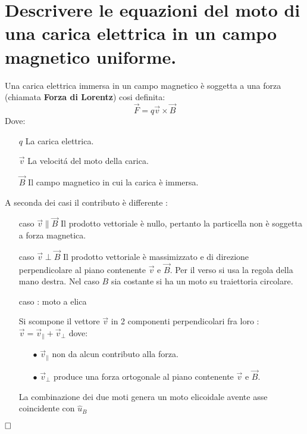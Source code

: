 \section{Descrivere le equazioni del moto di una carica elettrica
	in un campo magnetico uniforme.}
Una carica elettrica immersa in un campo magnetico \`e soggetta a una forza (chiamata \textbf{Forza di Lorentz}) cosi definita:
$$
    \vec{F} =  q\vec{v} \times \vec{B}
$$
Dove:
\begin{itemize}
	\item [$q$] { La carica elettrica. }
	\item [$\vec{v}$] { La velocit\'a del moto della carica. }
	\item [$\vec{B}$] { Il campo magnetico in cui la carica \`e immersa. }
\end{itemize}
A seconda dei casi il contributo \`e differente :
\begin{itemize}
	\item [caso $\vec{v} \parallel \vec{B}$] { Il prodotto vettoriale \`e nullo, pertanto la particella non \`e soggetta a forza magnetica. }
	\item [caso $\vec{v} \perp \vec{B}$] { Il prodotto vettoriale \`e massimizzato e di direzione perpendicolare al piano contenente $\vec{v}$ e $\vec{B}$. Per il verso si usa la regola della mano destra.
		Nel caso $B$ sia costante si ha un moto su traiettoria circolare. }
	\item [caso : moto a elica] { 
		Si scompone il vettore $\vec{v}$ in 2 componenti perpendicolari fra loro : \\
		$\vec{v} = \vec{v}_{\parallel} + \vec{v}_{\perp}$ dove:
		\begin{itemize}
			\item [$\bullet$] { 
				$\vec{v}_{\parallel}$ non da alcun contributo alla forza.
			}
			\item [$\bullet$] { $\vec{v}_{\perp}$ produce una forza ortogonale al piano contenente $\vec{v}$ e $\vec{B}$. }
		\end{itemize}
		La combinazione dei due moti genera un moto elicoidale avente asse coincidente con $\hat{u}_B$ 
	}
\end{itemize}
$\hfill\square$